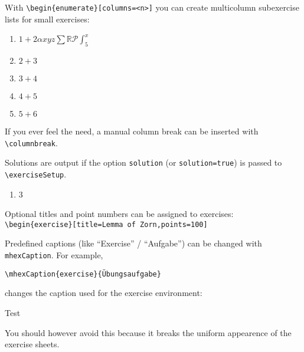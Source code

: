 \documentclass[german]{mhexsheet}
\begin{document}
\maketitle

\begin{exercise}
With \verb|\begin{enumerate}[columns=<n>]| you can create multicolumn subexercise lists for small exercises:
\begin{enumerate}[columns=3]
  \item $1+2\alpha xyz \sum\mathbb{R}\mathcal{P}\int_5^x$
  \item $2+3$
  \item $3+4$
  \item $4+5$
  \item $5+6$
\end{enumerate}
If you ever feel the need, a manual column break can be inserted with \verb|\columnbreak|.
\end{exercise}

\begin{solution}
Solutions are output if the option \verb|solution| (or \verb|solution=true|) is passed to \verb|\exerciseSetup|.
\begin{enumerate}
\item 3
\end{enumerate}
\end{solution}

\begin{exercise}[title=Lemma of Zorn,points=100]
Optional titles and point numbers can be assigned to exercises:\\
\verb!\begin{exercise}[title=Lemma of Zorn,points=100]!
\end{exercise}
Predefined captions (like \enquote{Exercise} / \enquote{Aufgabe}) can be changed with \verb|mhexCaption|. For example,
\begin{verbatim}
\mhexCaption{exercise}{Übungsaufgabe}
\end{verbatim}
changes the caption used for the exercise environment:
\begin{exercise}
Test
\end{exercise}
You should however avoid this because it breaks the uniform appearence of the exercise sheets.
\end{document}
